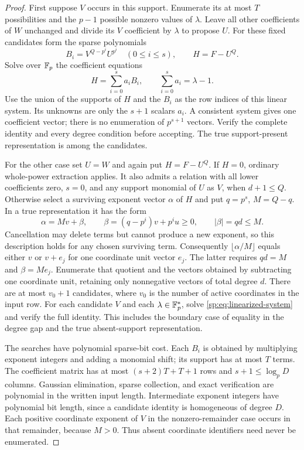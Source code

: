 \begin{proof}
First suppose $V$ occurs in this support. Enumerate its at most
$T$ possibilities and the $p-1$ possible nonzero values of
$\lambda$. Leave all other coefficients of $W$ unchanged and
divide its $V$ coefficient by $\lambda$ to propose $U$.
For these fixed candidates form the sparse polynomials
\[
 B_i=V^{Q-p^i}U^{p^i}\quad(0\le i\le s),\qquad H=F-U^Q.
\]
Solve over $\mathbb F_p$ the coefficient equations
\begin{equation}
 H=\sum_{i=0}^{s}a_i B_i,
 \qquad \sum_{i=0}^{s}a_i=\lambda-1.
 \label{sp:eq:linearized-system}
\end{equation}
Use the union of the supports of $H$ and the $B_i$ as the row
indices of this linear system. Its unknowns are only the $s+1$
scalars $a_i$. A consistent system gives one coefficient vector;
there is no enumeration of $p^{s+1}$ vectors. Verify the complete
identity and every degree condition before accepting. The true
support-present representation is among the candidates.

For the other case set $U=W$ and again put $H=F-U^Q$.
If $H=0$, ordinary whole-power extraction applies. It also admits
a relation with all lower coefficients zero, $s=0$, and any
support monomial of $U$ as $V$, when $d+1\le Q$.
Otherwise select a surviving exponent vector $\alpha$ of $H$
and put $q=p^s$, $M=Q-q$. In a true representation it has the form
\[
 \alpha=Mv+\beta,\qquad
 \beta=(q-p^i)v+p^iu\ge0,\qquad |\beta|=qd\le M.
\]
Cancellation may delete terms but cannot produce a new exponent,
so this description holds for any chosen surviving term.
Consequently $\lfloor\alpha/M\rfloor$ equals either $v$ or
$v+e_j$ for one coordinate unit vector $e_j$. The latter requires
$qd=M$ and $\beta=Me_j$. Enumerate that quotient and the vectors
obtained by subtracting one coordinate unit, retaining only
nonnegative vectors of total degree $d$. There are at most $v_0+1$
candidates, where $v_0$ is the number of active coordinates in
the input row. For each candidate $V$ and each
$\lambda\in\mathbb F_p^*$, solve \eqref{sp:eq:linearized-system} and
verify the full identity. This includes the boundary case of
equality in the degree gap and the true absent-support representation.

The searches have polynomial sparse-bit cost. Each $B_i$ is obtained
by multiplying exponent integers and adding a monomial shift;
its support has at most $T$ terms. The coefficient matrix has at
most $(s+2)T+T+1$ rows and $s+1\le\log_p D$ columns.
Gaussian elimination, sparse collection, and exact verification
are polynomial in the written input length. Intermediate exponent
integers have polynomial bit length, since a candidate identity is
homogeneous of degree $D$. Each positive coordinate exponent of
$V$ in the nonzero-remainder case occurs in that remainder, because
$M>0$. Thus absent coordinate identifiers need never be enumerated.


\end{proof}
